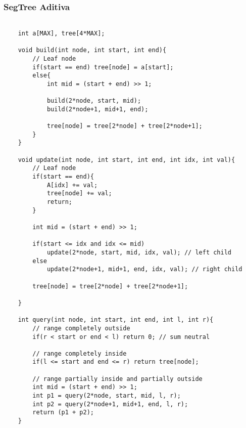 \subsubsection{SegTree Aditiva}
\begin{verbatim}

    int a[MAX], tree[4*MAX];

    void build(int node, int start, int end){
        // Leaf node
        if(start == end) tree[node] = a[start];        
        else{
            int mid = (start + end) >> 1;
            
            build(2*node, start, mid);
            build(2*node+1, mid+1, end);
            
            tree[node] = tree[2*node] + tree[2*node+1];
        }
    }
    
    void update(int node, int start, int end, int idx, int val){
        // Leaf node
        if(start == end){
            A[idx] += val;
            tree[node] += val;
            return;
        }
    
        int mid = (start + end) >> 1;
        
        if(start <= idx and idx <= mid) 
            update(2*node, start, mid, idx, val); // left child
        else 
            update(2*node+1, mid+1, end, idx, val); // right child
        
        tree[node] = tree[2*node] + tree[2*node+1];
        
    }

    int query(int node, int start, int end, int l, int r){
        // range completely outside
        if(r < start or end < l) return 0; // sum neutral

        // range completely inside
        if(l <= start and end <= r) return tree[node];
        
        // range partially inside and partially outside
        int mid = (start + end) >> 1;
        int p1 = query(2*node, start, mid, l, r);
        int p2 = query(2*node+1, mid+1, end, l, r);
        return (p1 + p2);
    }
\end{verbatim}

